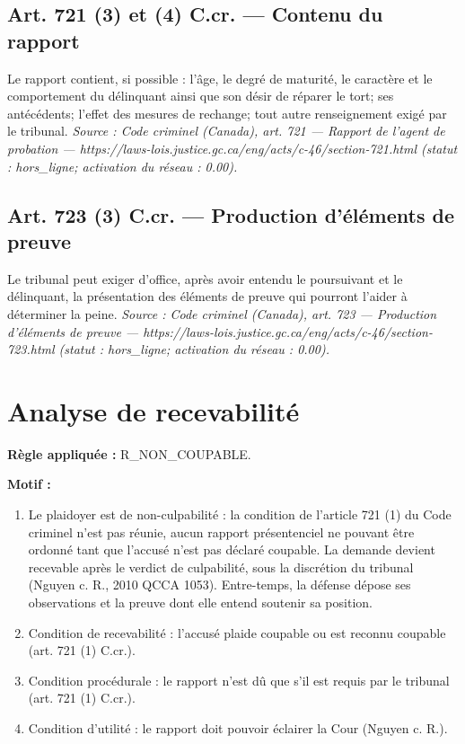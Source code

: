 \documentclass[12pt,letterpaper,oneside]{article}
\begin{document}
\subsection*{Art. 721 (3) et (4) C.cr. — Contenu du rapport}
Le rapport contient, si possible : l'âge, le degré de maturité, le caractère et le comportement du délinquant ainsi que son désir de réparer le tort; ses antécédents; l'effet des mesures de rechange; tout autre renseignement exigé par le tribunal.
\emph{Source : Code criminel (Canada), art. 721 — Rapport de l'agent de probation — https://laws-lois.justice.gc.ca/eng/acts/c-46/section-721.html (statut : hors\_ligne; activation du réseau : 0.00).}

\subsection*{Art. 723 (3) C.cr. — Production d'éléments de preuve}
Le tribunal peut exiger d'office, après avoir entendu le poursuivant et le délinquant, la présentation des éléments de preuve qui pourront l'aider à déterminer la peine.
\emph{Source : Code criminel (Canada), art. 723 — Production d'éléments de preuve — https://laws-lois.justice.gc.ca/eng/acts/c-46/section-723.html (statut : hors\_ligne; activation du réseau : 0.00).}


\section{Analyse de recevabilité}
\textbf{Règle appliquée :} R\_NON\_COUPABLE.

\textbf{Motif :}

\begin{enumerate}[leftmargin=*]
\item Le plaidoyer est de non-culpabilité : la condition de l'article 721 (1) du Code criminel n'est pas réunie, aucun rapport présentenciel ne pouvant être ordonné tant que l'accusé n'est pas déclaré coupable. La demande devient recevable après le verdict de culpabilité, sous la discrétion du tribunal (Nguyen c. R., 2010 QCCA 1053). Entre-temps, la défense dépose ses observations et la preuve dont elle entend soutenir sa position.
\item Condition de recevabilité : l'accusé plaide coupable ou est reconnu coupable (art. 721 (1) C.cr.).
\item Condition procédurale : le rapport n'est dû que s'il est requis par le tribunal (art. 721 (1) C.cr.).
\item Condition d'utilité : le rapport doit pouvoir éclairer la Cour (Nguyen c. R.).
\end{enumerate}
\end{document}
